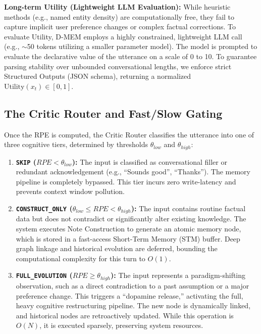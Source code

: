 \documentclass{article}
\begin{document}
\textbf{Long-term Utility (Lightweight LLM Evaluation):}
While heuristic methods (e.g., named entity density) are computationally free, they fail to capture implicit user preference changes or complex factual corrections. To evaluate Utility, D-MEM employs a highly constrained, lightweight LLM call (e.g., $\sim$50 tokens utilizing a smaller parameter model). The model is prompted to evaluate the declarative value of the utterance on a scale of 0 to 10. To guarantee parsing stability over unbounded conversational lengths, we enforce strict Structured Outputs (JSON schema), returning a normalized $\text{Utility}(x_t) \in [0, 1]$.

\subsection{The Critic Router and Fast/Slow Gating}

Once the RPE is computed, the Critic Router classifies the utterance into one of three cognitive tiers, determined by thresholds $\theta_{low}$ and $\theta_{high}$:

\begin{enumerate}
    \item \textbf{\texttt{SKIP} ($RPE < \theta_{low}$):} The input is classified as conversational filler or redundant acknowledgement (e.g., ``Sounds good'', ``Thanks''). The memory pipeline is completely bypassed. This tier incurs zero write-latency and prevents context window pollution.
    \item \textbf{\texttt{CONSTRUCT\_ONLY} ($\theta_{low} \le RPE < \theta_{high}$):} The input contains routine factual data but does not contradict or significantly alter existing knowledge. The system executes Note Construction to generate an atomic memory node, which is stored in a fast-access Short-Term Memory (STM) buffer. Deep graph linkage and historical evolution are deferred, bounding the computational complexity for this turn to $O(1)$.
    \item \textbf{\texttt{FULL\_EVOLUTION} ($RPE \ge \theta_{high}$):} The input represents a paradigm-shifting observation, such as a direct contradiction to a past assumption or a major preference change. This triggers a ``dopamine release,'' activating the full, heavy cognitive restructuring pipeline. The new node is dynamically linked, and historical nodes are retroactively updated. While this operation is $O(N)$, it is executed sparsely, preserving system resources.
\end{enumerate}
\end{document}
